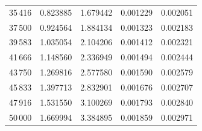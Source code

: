 \begin{table}[!h]
\begin{tabular}{r|rrrr}
        35\,416 & 0.823885        & 1.679442        & 0.001229     & 0.002051  \\
        37\,500 & 0.924564        & 1.884134        & 0.001323     & 0.002183  \\
        39\,583 & 1.035054        & 2.104206        & 0.001412     & 0.002321  \\
        41\,666 & 1.148560        & 2.336949        & 0.001494     & 0.002444  \\
        43\,750 & 1.269816        & 2.577580        & 0.001590     & 0.002579  \\
        45\,833 & 1.397713        & 2.832901        & 0.001676     & 0.002707  \\
        47\,916 & 1.531550        & 3.100269        & 0.001793     & 0.002840  \\
        50\,000 & 1.669994        & 3.384895        & 0.001859     & 0.002971  \\
        \hline
    \end{tabular}
\end{table}

